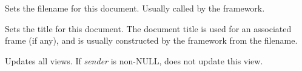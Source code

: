 Sets the filename for this document. Usually called by the framework.



Sets the title for this document. The document title is used for an associated
frame (if any), and is usually constructed by the framework from
the filename.

\label{wxdocumentupdateallviews}


Updates all views. If {\it sender} is non-NULL, does not update this view.

